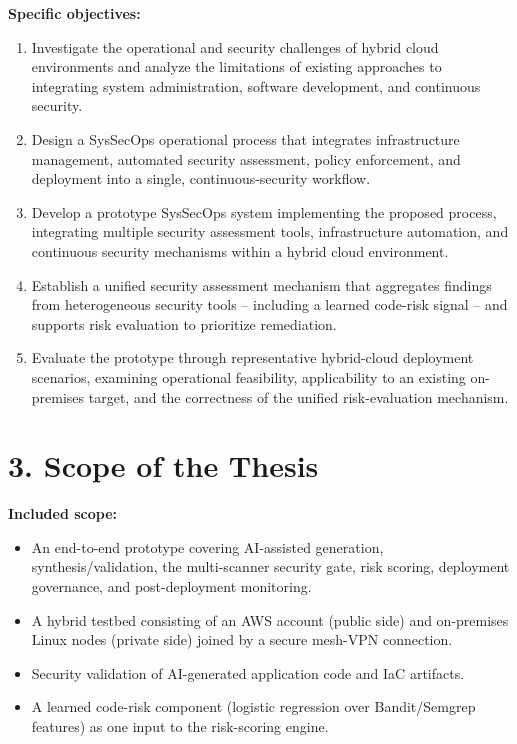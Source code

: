 \textbf{Specific objectives:}

\begin{enumerate}
    \item Investigate the operational and security challenges of hybrid cloud environments and
    analyze the limitations of existing approaches to integrating system administration, software
    development, and continuous security.
    \item Design a SysSecOps operational process that integrates infrastructure management, automated
    security assessment, policy enforcement, and deployment into a single, continuous-security
    workflow.
    \item Develop a prototype SysSecOps system implementing the proposed process, integrating
    multiple security assessment tools, infrastructure automation, and continuous security mechanisms
    within a hybrid cloud environment.
    \item Establish a unified security assessment mechanism that aggregates findings from
    heterogeneous security tools -- including a learned code-risk signal -- and supports risk
    evaluation to prioritize remediation.
    \item Evaluate the prototype through representative hybrid-cloud deployment scenarios, examining
    operational feasibility, applicability to an existing on-premises target, and the correctness of
    the unified risk-evaluation mechanism.
\end{enumerate}

\section*{3. Scope of the Thesis}

\textbf{Included scope:}
\begin{itemize}
    \item An end-to-end prototype covering AI-assisted generation, synthesis/validation, the
    multi-scanner security gate, risk scoring, deployment governance, and post-deployment monitoring.
    \item A hybrid testbed consisting of an AWS account (public side) and on-premises Linux nodes
    (private side) joined by a secure mesh-VPN connection.
    \item Security validation of AI-generated application code and IaC artifacts.
    \item A learned code-risk component (logistic regression over Bandit/Semgrep features) as one
    input to the risk-scoring engine.
\end{itemize}

